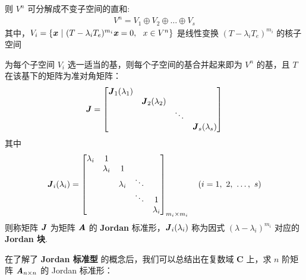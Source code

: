            则 $V^n$ 可分解成不变子空间的直和:
            \begin{align*}
                V^n = V_1 \oplus V_2 \oplus \dots \oplus V_s
            \end{align*}
            其中，$V_i = \{\textbf{\textit{x}} \ | \ (T - \lambda_iT_e)^{m_i}\textbf{\textit{x}} = 0, \ \ x \in V^n\}$ 是线性变换 $(T - \lambda_iT_e)^{m_i}$ 的核子空间
            \par 为每个子空间 $V_i$ 选一适当的基，则每个子空间的基合并起来即为 $V^n$ 的基，且 $T$ 在该基下的矩阵为准对角矩阵：
            \begin{align*}
                \textbf{\textit{J}} = \begin{bmatrix}
                    \textbf{\textit{J}}_1(\lambda_1) & & & \\ & \textbf{\textit{J}}_2(\lambda_2) & & \\ & & \ddots & \\ & & & \textbf{\textit{J}}_s(\lambda_s) \\
                \end{bmatrix}
            \end{align*}
            其中
            \begin{align*}
                \textbf{\textit{J}}_i(\lambda_i) = \begin{bmatrix}
                    \lambda_i & 1 & & & \\ & \lambda_i & 1 & & \\ & & \lambda_i & \ddots & \\ & & & \ddots & 1 \\ & & & & \lambda_i
                \end{bmatrix}_{m_i \times m_i} \quad (i = 1, \ 2, \ \dots, \ s)
            \end{align*}
            则称矩阵 $\textbf{\textit{J}}$ 为矩阵 $\textbf{\textit{A}}$ 的 \textbf{Jordan} 标准形，$\textbf{\textit{J}}_i(\lambda_i)$ 称为因式 $(\lambda - \lambda_i)^{m_i}$ 对应的 \textbf{Jordan 块}.
            \\
            \par 在了解了 \textbf{Jordan 标准型} 的概念后，我们可以总结出在复数域 \textbf{C} 上，求 $n$ 阶矩阵 $\textbf{\textit{A}}_{n \times n}$ 的 Jordan 标准形：
